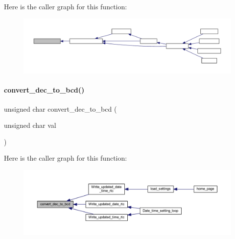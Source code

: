 Here is the caller graph for this function\+:
\nopagebreak
\begin{figure}[H]
\begin{center}
\leavevmode
\includegraphics[width=350pt]{a00023_a03795fe6451769e81af8ef69856e8acb_icgraph}
\end{center}
\end{figure}
\mbox{\label{a00023_abaa7c975d4dd864dbf88ce3c10029aa4}} 
\paragraph{convert\+\_\+dec\+\_\+to\+\_\+bcd()}
{\footnotesize\ttfamily unsigned char convert\+\_\+dec\+\_\+to\+\_\+bcd (\begin{DoxyParamCaption}\item[{unsigned char}]{val }\end{DoxyParamCaption})}

Here is the caller graph for this function\+:
\nopagebreak
\begin{figure}[H]
\begin{center}
\leavevmode
\includegraphics[width=350pt]{a00023_abaa7c975d4dd864dbf88ce3c10029aa4_icgraph}
\end{center}
\end{figure}
\mbox{\label{a00023_a0975bad4a272465d34f2dd42b61929f9}} 
